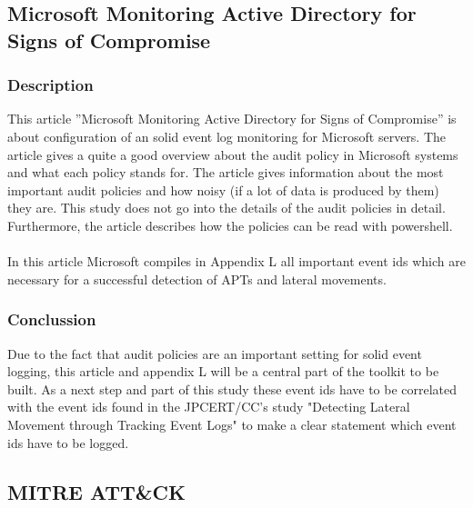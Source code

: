 \clearpage

\subsection{Microsoft Monitoring Active Directory for Signs of Compromise}
\subsubsection{Description}
This article ''Microsoft Monitoring Active Directory for Signs of Compromise'' \cite{MSADSignsOfCompromise} is about configuration of an solid event log monitoring for Microsoft servers. The article gives a quite a good overview about the audit policy in Microsoft systems and what each policy stands for. The article gives information about the most important audit policies and how noisy (if a lot of data is produced by them) they are. This study does not go into the details of the audit policies in detail. Furthermore, the article describes how the policies can be read with powershell.
\\\\
In this article Microsoft compiles in Appendix L \cite{MSAppendixL} all important event ids which are necessary for a successful detection of APTs and lateral movements.

\subsubsection{Conclussion}
Due to the fact that audit policies are an important setting for solid event logging, this article and appendix L will be a central part of the toolkit to be built. As a next step and part of this study these event ids have to be correlated with the event ids found in the JPCERT/CC's study "Detecting Lateral Movement through Tracking Event Logs" \cite{JPCERTDetectingLateralMovement} to make a clear statement which event ids have to be logged.

\subsection{MITRE ATT\&CK}
